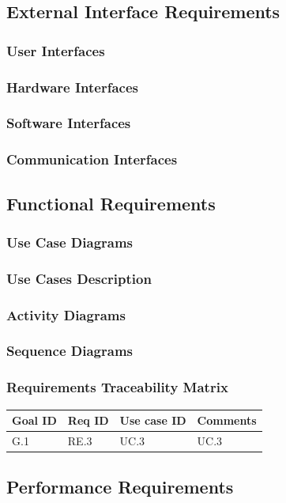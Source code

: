 \documentclass[12pt]{article}
\begin{document}
\subsection{External Interface Requirements}
\subsubsection{User Interfaces}

\subsubsection{Hardware Interfaces}

\subsubsection{Software Interfaces}

\subsubsection{Communication Interfaces}

\subsection{Functional Requirements}
\subsubsection{Use Case Diagrams}

\subsubsection{Use Cases Description}

\subsubsection{Activity Diagrams}

\subsubsection{Sequence Diagrams}

\subsubsection{Requirements Traceability Matrix}
\begin{tabular}{ | l | l | l | l |}
    \hline
    \textbf{Goal ID} & \textbf{Req ID} & \textbf{Use case ID} & \textbf{Comments} \\ \hline
    G.1 & RE.3 & UC.3 & UC.3 \\ \hline
\end{tabular}

\subsection{Performance Requirements}
\end{document}
